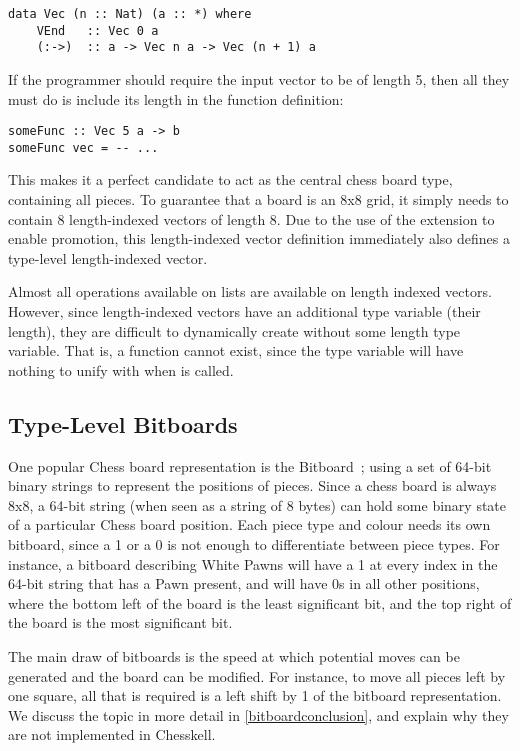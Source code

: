 \begin{lstlisting}
data Vec (n :: Nat) (a :: *) where
    VEnd   :: Vec 0 a
    (:->)  :: a -> Vec n a -> Vec (n + 1) a
\end{lstlisting}

If the programmer should require the input vector to be of length 5, then all they must do is include its length in the function definition:

\begin{lstlisting}
someFunc :: Vec 5 a -> b
someFunc vec = -- ...
\end{lstlisting}

This makes it a perfect candidate to act as the central chess board type, containing all pieces. To guarantee that a board is an 8x8 grid, it simply needs to contain 8 length-indexed vectors of length 8. Due to the use of the  extension to enable promotion, this length-indexed vector definition immediately also defines a type-level length-indexed vector.

Almost all operations available on lists are available on length indexed vectors. However, since length-indexed vectors have an additional type variable (their length), they are difficult to dynamically create without some length type variable. That is, a function  cannot exist, since the type variable  will have nothing to unify with when  is called.

\subsection{Type-Level Bitboards}

One popular Chess board representation is the Bitboard~\cite{bitboard}; using a set of 64-bit binary strings to represent the positions of pieces. Since a chess board is always 8x8, a 64-bit string (when seen as a string of 8 bytes) can hold some binary state of a particular Chess board position. Each piece type and colour needs its own bitboard, since a 1 or a 0 is not enough to differentiate between piece types. For instance, a bitboard describing White Pawns will have a 1 at every index in the 64-bit string that has a Pawn present, and will have 0s in all other positions, where the bottom left of the board is the least significant bit, and the top right of the board is the most significant bit.

The main draw of bitboards is the speed at which potential moves can be generated and the board can be modified. For instance, to move all pieces left by one square, all that is required is a left shift by 1 of the bitboard representation. We discuss the topic in more detail in \cref{bitboardconclusion}, and explain why they are not implemented in Chesskell.

